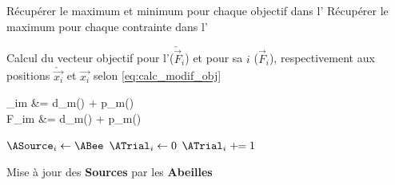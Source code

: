 \begin{algorithm}\label{alg:maj_phase}
  \SetAlgoVlined
  Récupérer le maximum et minimum pour chaque objectif dans l’\AHive\;
  Récupérer le maximum pour chaque contrainte dans l’\AHive\;
  \For{$\ABee \in \ABees$}
  {
    Calcul du vecteur objectif pour l’\ABee ($\check{\vec{F}}_{i}$) et pour sa \ASource $i$ ($\vec{F}_{i}$),
    respectivement aux positions $\check{\vec{x_{i}}}$ et $\vec{x_{i}}$
    selon \eqref{eq:calc_modif_obj}\;
    {
      \begin{algomathdisplay}
      \begin{aligned}
      _{im} &= d_{m}() + p_{m}() \\
      F_{im}         &= d_{m}() + p_{m}() \\
      \end{aligned}
      \end{algomathdisplay}
    }
    {
      $\ASource_{i} \leftarrow \ABee$\;
      $\ATrial_{i} \leftarrow 0$\;
    }
    \Else
    {
      $\ATrial_{i} \pluseq 1$\;
    }
  }
  \caption{Mise à jour des \textbf{Sources} par les \textbf{Abeilles}}
\end{algorithm}

